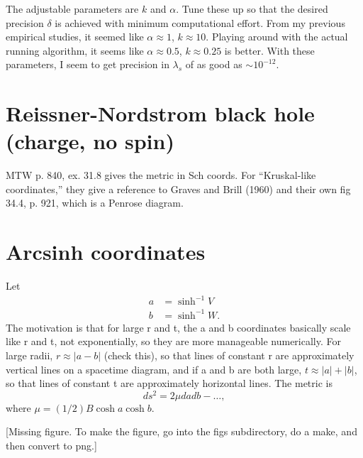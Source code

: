 \documentclass{article}
\begin{document}
The adjustable parameters are $k$ and $\alpha$. Tune these up so that
the desired precision $\delta$ is achieved with minimum computational effort.
From my previous empirical studies, it seemed like $\alpha\approx 1$, $k\approx 10$.
Playing around with the actual running algorithm, it seems like $\alpha\approx 0.5$, $k\approx 0.25$
is better. With these parameters, I seem to get precision in $\lambda_s$ of as good as
$\sim 10^{-12}$.

\section{Reissner-Nordstrom black hole (charge, no spin)}

MTW p. 840, ex. 31.8 gives the metric in Sch coords. For ``Kruskal-like coordinates,''
they give a reference to Graves and Brill (1960) and their own fig 34.4, p. 921,
which is a Penrose diagram.

\section{Arcsinh coordinates}

Let
\begin{align*}
  a & = \sinh^{-1} V \\
  b & = \sinh^{-1} W. 
\end{align*}
The motivation is that for large r and t, the
a and b coordinates basically scale like r and t, not exponentially, so they are more manageable numerically.
For large radii, $r\approx |a-b|$ (check this), so that lines of constant r are
approximately vertical lines on a spacetime diagram, and if a and b are both large,
$t\approx|a|+|b|$, so that lines of constant t are approximately horizontal lines.
The metric is
\begin{equation*}
  ds^2 = 2\mu dadb -\ldots,
\end{equation*}
where $\mu = (1/2)B\cosh a\cosh b$.

%
{%
  [Missing figure. To make the figure, go into the figs subdirectory, do a make, and then convert to png.]
}
\end{document}
